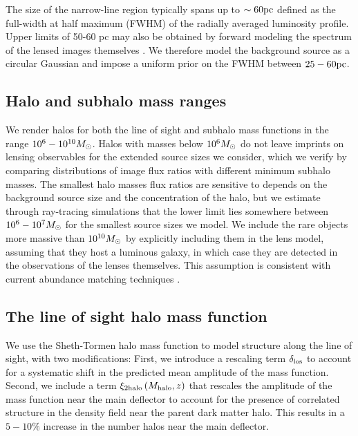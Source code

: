 The size of the narrow-line region typically spans up to $\sim 60 \rm{pc}$ \citep{MullerSanchez++11} defined as the full-width at half maximum (FWHM) of the radially averaged luminosity profile. Upper limits of 50-60 pc may also be obtained by forward modeling the spectrum of the lensed images themselves \citep{Nierenberg++17}. We therefore model the background source as a circular Gaussian and impose a uniform prior on the FWHM between $25 - 60 \rm{pc}$. 

\subsection{Halo and subhalo mass ranges}
We render halos for both the line of sight and subhalo mass functions in the range $10^6 - 10^{10} {M_{\odot}}$. Halos with masses below $10^{6} {M_{\odot}}$ do not leave imprints on lensing observables for the extended source sizes we consider, which we verify by comparing distributions of image flux ratios with different minimum subhalo masses. The smallest halo masses flux ratios are sensitive to depends on the background source size and the concentration of the halo, but we estimate through ray-tracing simulations that the lower limit lies somewhere between $10^6  - 10^7 {M_{\odot}}$ for the smallest source sizes we model. We include the rare objects more massive than $10^{10} {M_{\odot}}$ by explicitly including them in the lens model, assuming that they host a luminous galaxy, in which case they are detected in the observations of the lenses themselves. This assumption is consistent with current abundance matching techniques \citep{Kim++17b,Nadler++19}. 

\subsection{The line of sight halo mass function}
\label{ssec:losassumptions}
We use the Sheth-Tormen \citep{ST99} halo mass function to model structure along the line of sight, with two modifications: First, we introduce a rescaling term $\delta_{\rm{los}}$ to account for a systematic shift in the predicted mean amplitude of the mass function. Second, we include a term $\xi_{\rm{2halo}} \left(M_{\rm{halo}}, z\right)$ that rescales the amplitude of the mass function near the main deflector to account for the presence of correlated structure in the density field near the parent dark matter halo. This results in a $5 - 10 \%$ increase in the number halos near the main deflector. 

